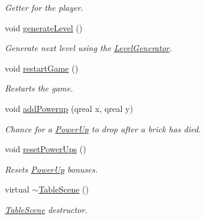 \begin{DoxyCompactItemize}
\begin{DoxyCompactList}\small\item\em Getter for the player. \end{DoxyCompactList}\item 
\hypertarget{class_table_scene_abae467079a839a7adf5eeced33189253}{void \hyperlink{class_table_scene_abae467079a839a7adf5eeced33189253}{generate\+Level} ()}\label{class_table_scene_abae467079a839a7adf5eeced33189253}

\begin{DoxyCompactList}\small\item\em Generate next level using the \hyperlink{class_level_generator}{Level\+Generator}. \end{DoxyCompactList}\item 
void \hyperlink{class_table_scene_aa84f2a633bab238f7883954f05a9ec74}{restart\+Game} ()
\begin{DoxyCompactList}\small\item\em Restarts the game. \end{DoxyCompactList}\item 
\hypertarget{class_table_scene_a3f42c598fe7e8f18271a34582a9daea8}{void \hyperlink{class_table_scene_a3f42c598fe7e8f18271a34582a9daea8}{add\+Powerup} (qreal x, qreal y)}\label{class_table_scene_a3f42c598fe7e8f18271a34582a9daea8}

\begin{DoxyCompactList}\small\item\em Chance for a \hyperlink{class_power_up}{Power\+Up} to drop after a brick has died. \end{DoxyCompactList}\item 
\hypertarget{class_table_scene_abe0a8dfbb359ae6363af75c093f17f99}{void \hyperlink{class_table_scene_abe0a8dfbb359ae6363af75c093f17f99}{reset\+Power\+Ups} ()}\label{class_table_scene_abe0a8dfbb359ae6363af75c093f17f99}

\begin{DoxyCompactList}\small\item\em Resets \hyperlink{class_power_up}{Power\+Up} bonuses. \end{DoxyCompactList}\item 
\hypertarget{class_table_scene_a28aeeac53bdc7570630d62b7872b1b37}{virtual \hyperlink{class_table_scene_a28aeeac53bdc7570630d62b7872b1b37}{$\sim$\+Table\+Scene} ()}\label{class_table_scene_a28aeeac53bdc7570630d62b7872b1b37}

\begin{DoxyCompactList}\small\item\em \hyperlink{class_table_scene}{Table\+Scene} destructor. \end{DoxyCompactList}\end{DoxyCompactItemize}
